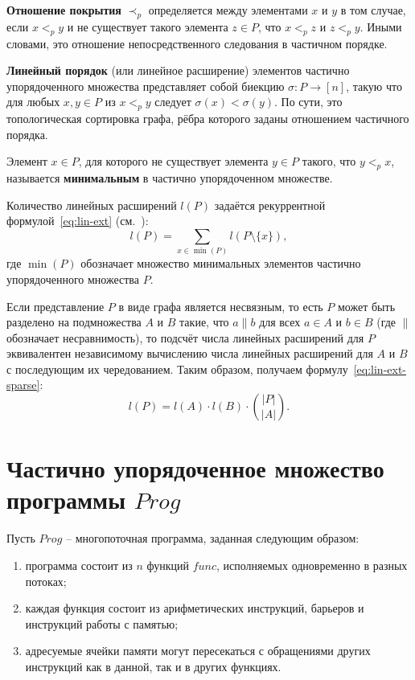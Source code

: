 \textbf{Отношение покрытия} $\prec_{p}$ определяется между элементами
$x$ и $y$ в том случае, если $x <_{p} y$ и не существует такого
элемента $z \in P$, что $x <_{p} z$ и $z <_{p} y$. Иными словами, это
отношение непосредственного следования в частичном порядке.

\textbf{Линейный порядок} (или линейное расширение) элементов
частично упорядоченного множества представляет собой биекцию $\sigma
: P \rightarrow [n]$, такую что для любых $x, y \in P$ из $x <_{p} y$
следует $\sigma(x) < \sigma(y)$. По сути, это топологическая
сортировка графа, рёбра которого заданы отношением частичного порядка.

Элемент $x \in P$, для которого не существует элемента $y \in P$
такого, что $y <_{p} x$, называется \textbf{минимальным} в частично
упорядоченном множестве.

Количество линейных расширений $l(P)$ задаётся рекуррентной
формулой~\ref{eq:lin-ext} (см.~\cite{linextcount}):
\begin{equation}
  \label{eq:lin-ext}
  l(P) = \sum_{x \in \min(P)} l(P \setminus \{x\}),
\end{equation}
где $\min(P)$ обозначает множество минимальных элементов частично
упорядоченного множества $P$.

Если представление $P$ в виде графа является несвязным, то есть $P$
может быть разделено на подмножества $A$ и $B$ такие, что $a
\parallel b$ для всех $a \in A$ и $b \in B$ (где $\parallel$
обозначает несравнимость), то подсчёт числа линейных расширений для
$P$ эквивалентен независимому вычислению числа линейных расширений
для $A$ и $B$ с последующим их чередованием. Таким образом, получаем
формулу~\ref{eq:lin-ext-sparse}:
\begin{equation}
  \label{eq:lin-ext-sparse}
  l(P) = l(A) \cdot l(B) \cdot \binom{|P|}{|A|}.
\end{equation}

\section{Частично упорядоченное множество программы $Prog$}
\label{sec:poset-prog}

Пусть $Prog$ -- многопоточная программа, заданная следующим образом:
\begin{enumerate}
  \item программа состоит из $n$ функций $func$, исполняемых
    одновременно в разных потоках;
  \item каждая функция состоит из арифметических инструкций, барьеров
    и инструкций работы с памятью;
  \item адресуемые ячейки памяти могут пересекаться с обращениями
    других инструкций как в данной, так и в других функциях.
\end{enumerate}

